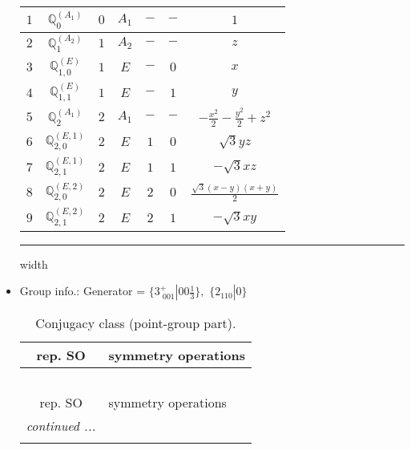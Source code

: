 \documentclass[fleqn,10pt,landscape]{article}
\begin{document}
\begin{itemize}
\begin{center}
\begin{longtable}{ccccccc}
$ 1 $ & $ \mathbb{Q}_{0}^{(A_{1})} $ & $ 0 $ & $ A_{1} $ & $ - $ & $ - $ & $ 1 $ \\ \hline
$ 2 $ & $ \mathbb{Q}_{1}^{(A_{2})} $ & $ 1 $ & $ A_{2} $ & $ - $ & $ - $ & $ z $ \\
$ 3 $ & $ \mathbb{Q}_{1,0}^{(E)} $ & $ 1 $ & $ E $ & $ - $ & $ 0 $ & $ x $ \\
$ 4 $ & $ \mathbb{Q}_{1,1}^{(E)} $ & $ 1 $ & $ E $ & $ - $ & $ 1 $ & $ y $ \\ \hline
$ 5 $ & $ \mathbb{Q}_{2}^{(A_{1})} $ & $ 2 $ & $ A_{1} $ & $ - $ & $ - $ & $ - \frac{x^{2}}{2} - \frac{y^{2}}{2} + z^{2} $ \\
$ 6 $ & $ \mathbb{Q}_{2,0}^{(E,1)} $ & $ 2 $ & $ E $ & $ 1 $ & $ 0 $ & $ \sqrt{3} y z $ \\
$ 7 $ & $ \mathbb{Q}_{2,1}^{(E,1)} $ & $ 2 $ & $ E $ & $ 1 $ & $ 1 $ & $ - \sqrt{3} x z $ \\
$ 8 $ & $ \mathbb{Q}_{2,0}^{(E,2)} $ & $ 2 $ & $ E $ & $ 2 $ & $ 0 $ & $ \frac{\sqrt{3} \left(x - y\right) \left(x + y\right)}{2} $ \\
$ 9 $ & $ \mathbb{Q}_{2,1}^{(E,2)} $ & $ 2 $ & $ E $ & $ 2 $ & $ 1 $ & $ - \sqrt{3} x y $ \\
\end{longtable}
\end{center}

 \hfil \hrule height 1mm width \textwidth \hfil

\item Group info.: Generator = $\{3^{+}_{\,\,001}|0 0 \frac{1}{3}\},\,\,\{2{}_{110}|0\}$

\begin{center}
\renewcommand{\arraystretch}{1.3}
\begin{longtable}{c|l}
\caption{Conjugacy class (point-group part).}
 \\
 \hline \hline
rep. SO & symmetry operations \\ \hline \endfirsthead

\multicolumn{1}{l}{\tablename\ \thetable{}} \\
 \hline \hline
rep. SO & symmetry operations \\ \hline \endhead

 \hline \hline
\multicolumn{1}{r}{\footnotesize\it continued ...} \\ \endfoot


\end{longtable}
\end{center}
\end{itemize}
\end{document}
